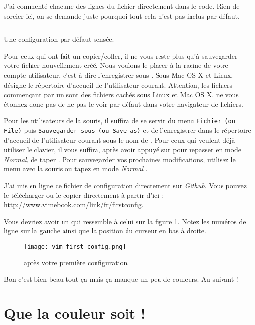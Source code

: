 J'ai commenté chacune des lignes du fichier directement dans le code. Rien de sorcier ici, on se demande juste pourquoi tout cela n'est pas inclus par défaut.

\begin{listing}[H]
    \inputminted[bgcolor=bg, fontsize=\footnotesize]{vim}{../../vim-for-humans/firstconfig/vimrc}
    \caption{Une configuration par défaut sensée.}
    \label{code:first-config}
\end{listing}

Pour ceux qui ont fait un copier/coller, il ne vous reste plus qu'à sauvegarder votre fichier nouvellement créé. Nous voulons le placer à la racine de votre compte utilisateur, c'est à dire l'enregistrer sous . Sous Mac OS X et Linux, \hlred{\Verb|\textasciitilde{}|} désigne le répertoire d'accueil de l'utilisateur courant. Attention, les fichiers commençant par un  sont des fichiers cachés sous Linux et Mac OS X, ne vous étonnez donc pas de ne pas le voir par défaut dans votre navigateur de fichiers.

Pour les utilisateurs de la souris, il suffira de se servir du menu \Verb|Fichier (ou File)| puis \Verb|Sauvegarder sous (ou Save as)| et de l'enregistrer dans le répertoire d'accueil de l'utilisateur courant sous le nom de . Pour ceux qui veulent déjà utiliser le clavier, il vous suffira, après avoir appuyé sur \ttesc pour repasser en mode \emph{Normal}, de taper . Pour sauvegarder vos prochaines modifications, utilisez le menu avec la souris ou tapez en mode \emph{Normal} .

J'ai mis en ligne ce fichier de configuration directement sur \emph{Github}. Vous pouvez le télécharger ou le copier directement à partir d'ici : \url{http://www.vimebook.com/link/fr/firstconfig}.

Vous devriez avoir un \vim qui ressemble à celui sur la figure \ref{fig:first-config}. Notez les numéros de ligne sur la gauche ainsi que la position du curseur en bas à droite.

\begin{figure}%
  \texttt{[image: vim-first-config.png]}
  \caption{\vim après votre première configuration.}
  \label{fig:first-config}
\end{figure}

Bon c'est bien beau tout ça mais ça manque un peu de couleurs. Au suivant !

\section{Que la couleur soit !}

